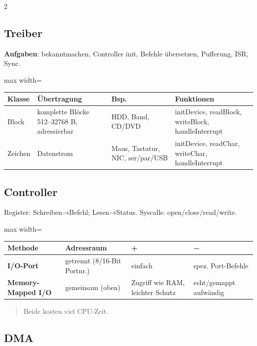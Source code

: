 \documentclass[10pt, a4paper]{article}
\begin{document}
\begin{multicols}{2}
\subsection{Treiber}
\textbf{Aufgaben}: bekanntmachen, Controller init, Befehle übersetzen, Pufferung, ISR, Sync.



{\small
\begin{adjustbox}{max width=\linewidth}
{\scriptsize
\begin{tabular}{llll}
\toprule
\textbf{Klasse} & \textbf{Übertragung} & \textbf{Bsp.} & \textbf{Funktionen} \\
\midrule
Block & komplette Blöcke 512–32768 B, adressierbar & HDD, Band, CD/DVD & initDevice, readBlock, writeBlock, handleInterrupt \\
Zeichen & Datenstrom & Maus, Tastatur, NIC, ser/par/USB & initDevice, readChar, writeChar, handleInterrupt \\
\bottomrule
\end{tabular}
}
\end{adjustbox}
}



\subsection{Controller}
Register: Schreiben→Befehl; Lesen→Status. Syscalls: open/close/read/write.



{\small
\begin{adjustbox}{max width=\linewidth}
{\scriptsize
\begin{tabular}{llll}
\toprule
\textbf{Methode} & \textbf{Adressraum} & \textbf{+} & \textbf{−} \\
\midrule
\textbf{I/O-Port} & getrennt (8/16-Bit Portnr.) & einfach & spez. Port-Befehle \\
\textbf{Memory-Mapped I/O} & gemeinsam (oben) & Zugriff wie RAM, leichter Schutz & echt/gemappt aufwändig \\
\bottomrule
\end{tabular}
}
\end{adjustbox}
}


\begin{quote}
Beide kosten viel CPU-Zeit.
\end{quote}


\subsection{DMA}


\end{multicols}
\end{document}
